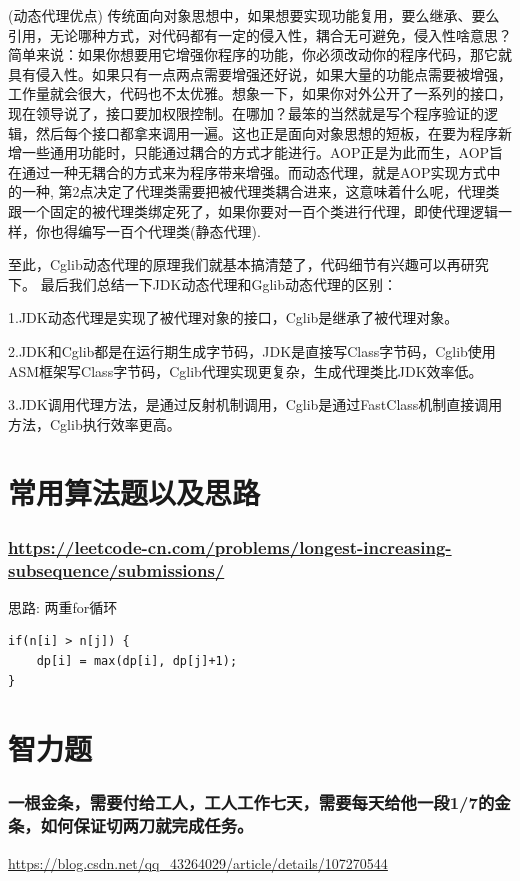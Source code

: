 \documentclass[UTF8]{ctexart}
\begin{document}
(动态代理优点)
传统面向对象思想中，如果想要实现功能复用，要么继承、要么引用，无论哪种方式，对代码都有一定的侵入性，耦合无可避免，侵入性啥意思？简单来说：如果你想要用它增强你程序的功能，你必须改动你的程序代码，那它就具有侵入性。如果只有一点两点需要增强还好说，如果大量的功能点需要被增强，工作量就会很大，代码也不太优雅。想象一下，如果你对外公开了一系列的接口，现在领导说了，接口要加权限控制。在哪加？最笨的当然就是写个程序验证的逻辑，然后每个接口都拿来调用一遍。这也正是面向对象思想的短板，在要为程序新增一些通用功能时，只能通过耦合的方式才能进行。AOP正是为此而生，AOP旨在通过一种无耦合的方式来为程序带来增强。而动态代理，就是AOP实现方式中的一种, 第2点决定了代理类需要把被代理类耦合进来，这意味着什么呢，代理类跟一个固定的被代理类绑定死了，如果你要对一百个类进行代理，即使代理逻辑一样，你也得编写一百个代理类(静态代理).


至此，Cglib动态代理的原理我们就基本搞清楚了，代码细节有兴趣可以再研究下。
最后我们总结一下JDK动态代理和Gglib动态代理的区别：

1.JDK动态代理是实现了被代理对象的接口，Cglib是继承了被代理对象。

2.JDK和Cglib都是在运行期生成字节码，JDK是直接写Class字节码，Cglib使用ASM框架写Class字节码，Cglib代理实现更复杂，生成代理类比JDK效率低。

3.JDK调用代理方法，是通过反射机制调用，Cglib是通过FastClass机制直接调用方法，Cglib执行效率更高。

\section{常用算法题以及思路}
\subsubsection{\url{https://leetcode-cn.com/problems/longest-increasing-subsequence/submissions/}}
思路: 两重for循环
\begin{lstlisting}
if(n[i] > n[j]) {
	dp[i] = max(dp[i], dp[j]+1);
}
\end{lstlisting}

\section{智力题}

\subsubsection{一根金条，需要付给工人，工人工作七天，需要每天给他一段1/7的金条，如何保证切两刀就完成任务。}
\url{https://blog.csdn.net/qq_43264029/article/details/107270544}
\end{document}
